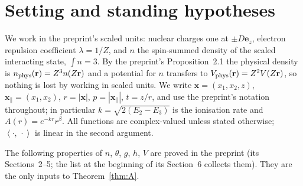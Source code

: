\documentclass[11pt,a4paper]{article}
\theoremstyle{plain}
\theoremstyle{definition}
\theoremstyle{remark}
\newcommand{\ip}[2]{\left\langle #1,\,#2\right\rangle}
\begin{document}
\section{Setting and standing hypotheses}\label{sec:setting}

We work in the preprint's scaled units: nuclear charges one at $\pm D\mathbf e_z$, electron repulsion coefficient $\lambda=1/Z$, and $n$ the spin-summed density of the scaled interacting state, $\int n=3$. By the preprint's Proposition~2.1 the physical density is $n_{\rm phys}(\mathbf r)=Z^3 n(Z\mathbf r)$ and a potential for $n$ transfers to $V_{\rm phys}(\mathbf r)=Z^2V(Z\mathbf r)$, so nothing is lost by working in scaled units. We write $\mathbf x=(x_1,x_2,z)$, $\mathbf x_\parallel=(x_1,x_2)$, $r=|\mathbf x|$, $p=|\mathbf x_\parallel|$, $t=z/r$, and use the preprint's notation throughout; in particular $k=\sqrt{2(E_2-E_3)}$ is the ionisation rate and $A(r)=e^{-kr}r^\beta$. All functions are complex-valued unless stated otherwise; $\ip{\cdot}{\cdot}$ is linear in the second argument.

The following properties of $n$, $\theta$, $g$, $h$, $V$ are proved in the preprint (its Sections~2--5; the list at the beginning of its Section~6 collects them). They are the only inputs to Theorem~\ref{thm:A}.
\end{document}
